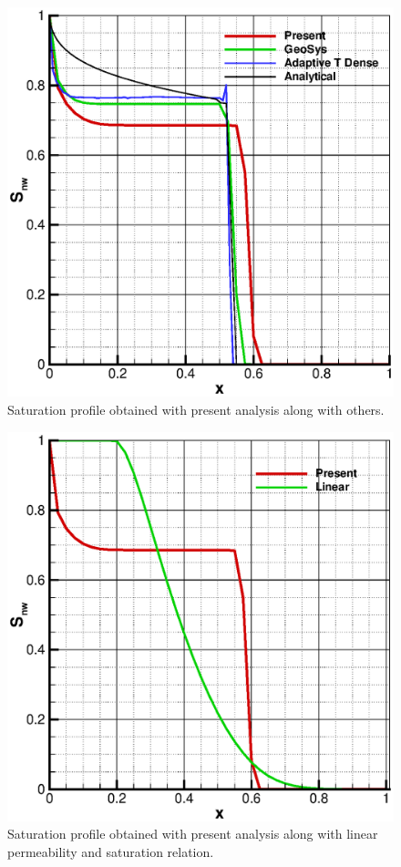 \begin{figure}[!thb]
\begin{center}
\includegraphics[scale=0.5]{HH/figures/BL-Sw.eps}
\end{center}
\caption{Saturation profile obtained with present analysis along with others.}
\label{bl:comparison}
\end{figure}
\begin{figure}[!thb]
\begin{center}
\includegraphics[scale=0.5]{HH/figures/BL-Sw-Linear.eps}
\end{center}
\caption{Saturation profile obtained with present analysis along with linear permeability and saturation relation.}
\label{bl:comparison}
\end{figure}
\clearpage
